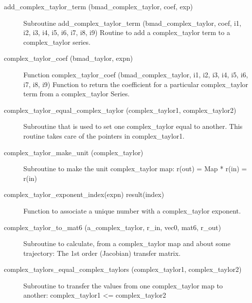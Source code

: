 \begin{description}

\label{r:add.complex.taylor.term}
\item[add_complex_taylor_term (bmad_complex_taylor, coef, exp)] \Newline 
Subroutine add_complex_taylor_term (bmad_complex_taylor, coef, i1, i2, i3, i4, i5, i6, i7, i8, i9)
Routine to add a complex_taylor term to a complex_taylor series.

\label{r:complex.taylor.coef}
\item[complex_taylor_coef (bmad_taylor, expn)] \Newline 
Function complex_taylor_coef (bmad_complex_taylor, i1, i2, i3, i4, i5, i6, i7, i8, i9)
Function to return the coefficient for a particular complex_taylor term
from a complex_taylor Series.

\label{r:complex.taylor.equal.complex.taylor}
\item[complex_taylor_equal_complex_taylor (complex_taylor1, complex_taylor2)] \Newline 
Subroutine that is used to set one complex_taylor equal to another. 
This routine takes care of the pointers in complex_taylor1. 

\label{r:complex.taylor.make.unit}
\item[complex_taylor_make_unit (complex_taylor)] \Newline 
Subroutine to make the unit complex_taylor map:
      r(out) = Map * r(in) = r(in)

\label{r:complex.taylor.exponent.index}
\item[complex_taylor_exponent_index(expn) result(index)] \Newline 
Function to associate a unique number with a complex_taylor exponent.

\label{r:complex.taylor.to.mat6}
\item[complex_taylor_to_mat6 (a_complex_taylor, r_in, vec0, mat6, r_out)] \Newline 
Subroutine to calculate, from a complex_taylor map and about some trajectory:
  The 1st order (Jacobian) transfer matrix.

\label{r:complex.taylors.equal.complex.taylors}
\item[complex_taylors_equal_complex_taylors (complex_taylor1, complex_taylor2)] \Newline 
Subroutine to transfer the values from one complex_taylor map to another:
    complex_taylor1 <= complex_taylor2


\end{description}
